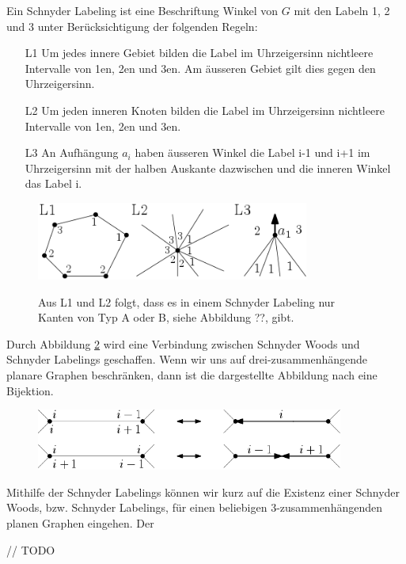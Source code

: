\begin{definition}
Ein Schnyder Labeling ist eine Beschriftung Winkel von $G$ mit den Labeln 1, 2 und 3 unter Berücksichtigung der folgenden Regeln:
\begin{itemize}
\item[L1] Um jedes innere Gebiet bilden die Label im Uhrzeigersinn nichtleere Intervalle von 1en, 2en und 3en. Am äusseren Gebiet gilt dies gegen den Uhrzeigersinn.
\item[L2] Um jeden inneren Knoten bilden die Label im Uhrzeigersinn nichtleere Intervalle von 1en, 2en und 3en.
\item[L3] An Aufhängung $a_i$ haben äusseren Winkel die Label i-1 und i+1 im Uhrzeigersinn mit der halben Auskante dazwischen und die inneren Winkel das Label i.
\end{itemize} 
\end{definition}

\begin{figure}[h]
	\centering
  \includegraphics[width=0.8\textwidth]{schnyder_label_def.png}
	\label{schnyder_label}
	\caption{Aus L1 und L2 folgt, dass es in einem Schnyder Labeling nur Kanten von Typ A oder B,  siehe Abbildung ??, gibt.}

\end{figure}

Durch Abbildung \ref{schnyder_bij} wird eine Verbindung zwischen Schnyder Woods und Schnyder Labelings geschaffen. Wenn wir uns auf drei-zusammenhängende planare Graphen beschränken, dann ist die dargestellte Abbildung nach \cite[Theorem 2.3]{felsner04} eine Bijektion.

\begin{figure}[h]
	\centering
  \includegraphics[width=0.9\textwidth]{schnyder_bij.png}
	\label{schnyder_bij}
	\caption{}
\end{figure}

Mithilfe der Schnyder Labelings können wir kurz auf die Existenz einer Schnyder Woods, bzw. Schnyder Labelings, für einen beliebigen 3-zusammenhängenden planen Graphen eingehen. Der 

// TODO

